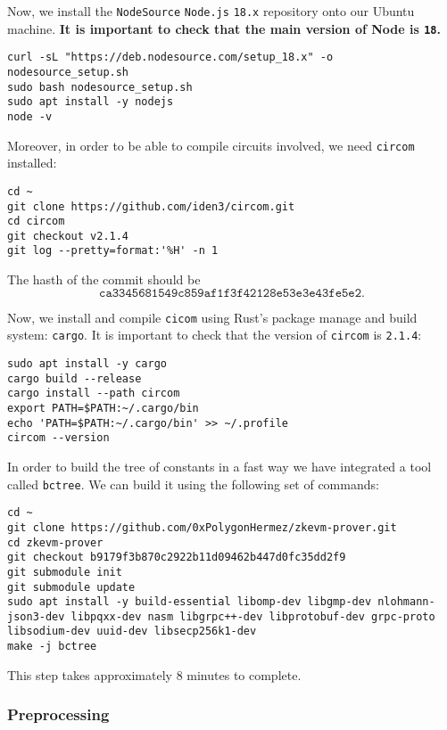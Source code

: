 Now, we install the \texttt{NodeSource} \texttt{Node.js} \texttt{18.x} repository onto our Ubuntu machine. \textbf{It is important to check that the main version of Node is \texttt{18}. }

\begin{lstlisting}[style=termt]
curl -sL "https://deb.nodesource.com/setup_18.x" -o nodesource_setup.sh
sudo bash nodesource_setup.sh
sudo apt install -y nodejs
node -v
\end{lstlisting}

Moreover, in order to be able to compile circuits involved, we need \texttt{circom} installed: 

\begin{lstlisting}[style=termt]
cd ~
git clone https://github.com/iden3/circom.git
cd circom
git checkout v2.1.4
git log --pretty=format:'%H' -n 1
\end{lstlisting}

The hasth of the commit should be 
\[
\texttt{ca3345681549c859af1f3f42128e53e3e43fe5e2.}
\]

Now, we install and compile \texttt{cicom} using Rust's package manage and build system: \texttt{cargo}. It is important to check that the version of \texttt{circom} is \texttt{2.1.4}:

\begin{lstlisting}[style=termt]
sudo apt install -y cargo
cargo build --release
cargo install --path circom
export PATH=$PATH:~/.cargo/bin
echo 'PATH=$PATH:~/.cargo/bin' >> ~/.profile
circom --version
\end{lstlisting}

In order to build the tree of constants in a fast way we have integrated a tool called \texttt{bctree}. We can build it using the following set of commands:

\begin{lstlisting}[style=termt]
cd ~
git clone https://github.com/0xPolygonHermez/zkevm-prover.git
cd zkevm-prover
git checkout b9179f3b870c2922b11d09462b447d0fc35dd2f9
git submodule init
git submodule update
sudo apt install -y build-essential libomp-dev libgmp-dev nlohmann-json3-dev libpqxx-dev nasm libgrpc++-dev libprotobuf-dev grpc-proto libsodium-dev uuid-dev libsecp256k1-dev
make -j bctree
\end{lstlisting}

This step takes approximately $8$ minutes to complete.



\subsubsection{Preprocessing}


